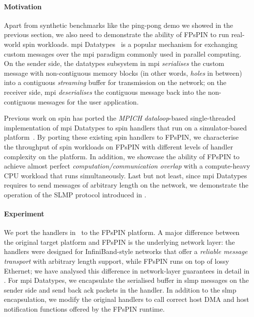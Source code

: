 \paragraph{Motivation} Apart from synthetic benchmarks like the ping-pong demo we showed in the previous section, we also need to demonstrate the ability of FPsPIN to run real-world \ac{spin} workloads.  \Ac{mpi} Datatypes~\cite{pierce_types_2002} is a popular mechanism for exchanging custom messages over the \ac{mpi} paradigm commonly used in parallel computing.  On the sender side, the datatypes subsystem in \ac{mpi} \emph{serialises} the custom message with non-contiguous memory blocks (in other words, \emph{holes} in between) into a contiguous \emph{streaming} buffer for transmission on the network; on the receiver side, \ac{mpi} \emph{deserialises} the contiguous message back into the non-contiguous messages for the user application.

Previous work on \ac{spin} has ported the \emph{MPICH dataloop}-based single-threaded implementation of \ac{mpi} Datatypes to \ac{spin} handlers that run on a simulator-based platform~\cite{di_girolamo_network-accelerated_2019}.  By porting these existing \ac{spin} handlers to FPsPIN, we characterise the throughput of \ac{spin} workloads on FPsPIN with different levels of handler complexity on the platform.  In addition, we showcase the ability of FPsPIN to achieve almost perfect \emph{computation/communication overlap} with a compute-heavy CPU workload that runs simultaneously.  Last but not least, since \ac{mpi} Datatypes requires to send messages of arbitrary length on the network, we demonstrate the operation of the SLMP protocol introduced in .

\paragraph{Experiment} We port the handlers in~\cite{di_girolamo_network-accelerated_2019} to the FPsPIN platform.
A major difference between the original target platform and FPsPIN is the underlying network layer: the handlers were designed for InfiniBand-style networks that offer a \emph{reliable message transport} with arbitrary length support, while FPsPIN runs on top of lossy Ethernet; we have analysed this difference in network-layer guarantees in detail in .  For \ac{mpi} Datatypes, we encapsulate the serialised buffer in \ac{slmp} messages on the sender side and send back \ac{ack} packets in the handler.  In addition to the \ac{slmp} encapsulation, we modify the original handlers to call correct host DMA and host notification functions offered by the FPsPIN runtime. 

